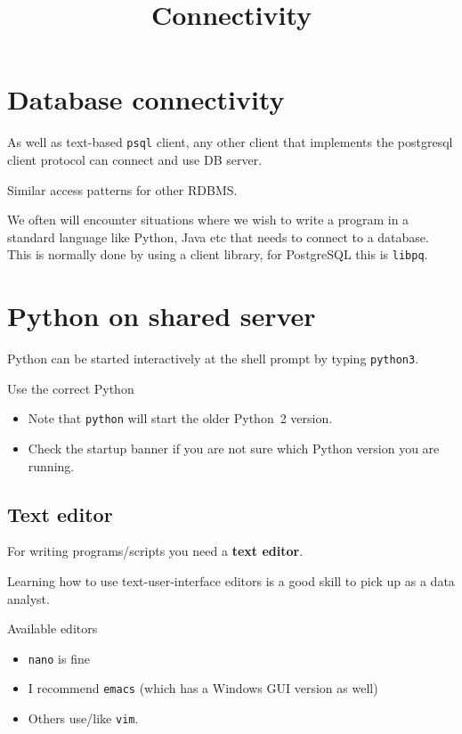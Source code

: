 \documentclass[slides]{pgnotes}
\title{Connectivity}
\begin{document}
\maketitle

\section{Database connectivity}
\label{sec:database-connectivity}

As well as text-based \texttt{psql} client, any other client that
implements the postgresql client protocol can connect and use DB server.

Similar access patterns for other RDBMS.

We often will encounter situations where we wish to write a program in a standard language like Python, Java etc that needs to connect to a database.
This is normally done by using a client library, for PostgreSQL this is \texttt{libpq}.

\section{Python on shared server}
\label{sec:python-on-shared-server}

Python can be started interactively at the shell prompt by typing
\texttt{python3}.

\begin{redbox}{Use the correct Python}
  \begin{itemize}
  \item Note that \texttt{python} will start the older Python~2 version.
  \item Check the startup banner if you are not sure which Python version you are running.
  \end{itemize}
\end{redbox}

\subsection{Text editor}

For writing programs/scripts you need a \textbf{text editor}.

Learning how to use text-user-interface editors is a good skill to pick up as a data analyst.

\begin{greenbox}{Available editors}
  \begin{itemize}
  \item \texttt{nano} is fine
  \item I recommend \texttt{emacs} (which has a Windows GUI version as well)
  \item Others use/like \texttt{vim}.
  \end{itemize}
\end{greenbox}
\end{document}
